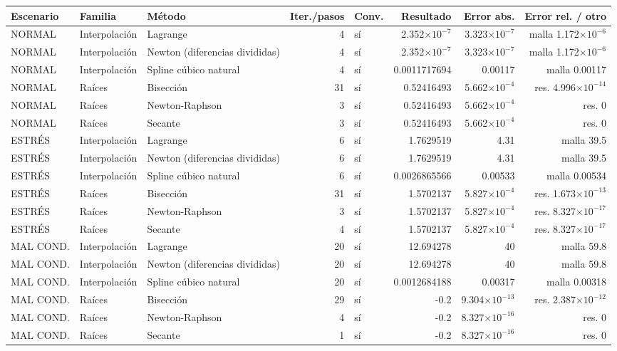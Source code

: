 {\footnotesize
\begin{longtable}{lllrlrrr}
\toprule
\textbf{Escenario} & \textbf{Familia} & \textbf{Método} & \textbf{Iter./pasos} & \textbf{Conv.} & \textbf{Resultado} & \textbf{Error abs.} & \textbf{Error rel. / otro} \\
\midrule
\endhead
NORMAL & Interpolación & Lagrange & 4 & sí & 2.352$\times10^{-7}$ & 3.323$\times10^{-7}$ & malla 1.172$\times10^{-6}$ \\
NORMAL & Interpolación & Newton (diferencias divididas) & 4 & sí & 2.352$\times10^{-7}$ & 3.323$\times10^{-7}$ & malla 1.172$\times10^{-6}$ \\
NORMAL & Interpolación & Spline cúbico natural & 4 & sí & 0.0011717694 & 0.00117 & malla 0.00117 \\
NORMAL & Raíces & Bisección & 31 & sí & 0.52416493 & 5.662$\times10^{-4}$ & res. 4.996$\times10^{-14}$ \\
NORMAL & Raíces & Newton-Raphson & 3 & sí & 0.52416493 & 5.662$\times10^{-4}$ & res. 0 \\
NORMAL & Raíces & Secante & 3 & sí & 0.52416493 & 5.662$\times10^{-4}$ & res. 0 \\
ESTRÉS & Interpolación & Lagrange & 6 & sí & 1.7629519 & 4.31 & malla 39.5 \\
ESTRÉS & Interpolación & Newton (diferencias divididas) & 6 & sí & 1.7629519 & 4.31 & malla 39.5 \\
ESTRÉS & Interpolación & Spline cúbico natural & 6 & sí & 0.0026865566 & 0.00533 & malla 0.00534 \\
ESTRÉS & Raíces & Bisección & 31 & sí & 1.5702137 & 5.827$\times10^{-4}$ & res. 1.673$\times10^{-13}$ \\
ESTRÉS & Raíces & Newton-Raphson & 3 & sí & 1.5702137 & 5.827$\times10^{-4}$ & res. 8.327$\times10^{-17}$ \\
ESTRÉS & Raíces & Secante & 4 & sí & 1.5702137 & 5.827$\times10^{-4}$ & res. 8.327$\times10^{-17}$ \\
MAL COND. & Interpolación & Lagrange & 20 & sí & 12.694278 & 40 & malla 59.8 \\
MAL COND. & Interpolación & Newton (diferencias divididas) & 20 & sí & 12.694278 & 40 & malla 59.8 \\
MAL COND. & Interpolación & Spline cúbico natural & 20 & sí & 0.0012684188 & 0.00317 & malla 0.00318 \\
MAL COND. & Raíces & Bisección & 29 & sí & -0.2 & 9.304$\times10^{-13}$ & res. 2.387$\times10^{-12}$ \\
MAL COND. & Raíces & Newton-Raphson & 4 & sí & -0.2 & 8.327$\times10^{-16}$ & res. 0 \\
MAL COND. & Raíces & Secante & 1 & sí & -0.2 & 8.327$\times10^{-16}$ & res. 0 \\
\bottomrule
\end{longtable}
}
